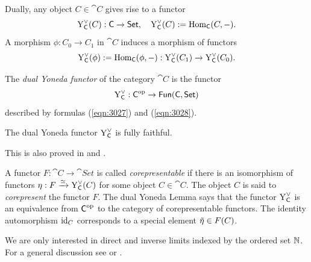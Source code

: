 Dually, any object $C \in \cat{C}$ gives rise to a functor
\begin{equation} \label{eqn:3027}
\operatorname{Y}_{\operatorname{\mathsf{C}}}^{\vee}(C) : \operatorname{\mathsf{C}} \to \operatorname{\mathsf{Set}} , \quad
\operatorname{Y}_{\operatorname{\mathsf{C}}}^{\vee}(C) := \operatorname{Hom}_{\operatorname{\mathsf{C}}}(C, -) . 
\end{equation}
A morphism $\phi : C_0 \to C_1$ in $\cat{C}$ induces a morphism of 
functors
\begin{equation} \label{eqn:3028}
\operatorname{Y}_{\operatorname{\mathsf{C}}}^{\vee}(\phi) := \operatorname{Hom}_{\operatorname{\mathsf{C}}}(\phi, -) : 
\operatorname{Y}_{\operatorname{\mathsf{C}}}^{\vee}(C_1) \to \operatorname{Y}_{\operatorname{\mathsf{C}}}^{\vee}(C_0) .
\end{equation}

\begin{dfn} \label{dfn:3026}
The {\em dual Yoneda functor} of the category $\cat{C}$ is the functor
\[ \operatorname{Y}_{\operatorname{\mathsf{C}}}^{\vee} : \operatorname{\mathsf{C}}^{\mathrm{op}} \to 
\operatorname{\mathsf{Fun}}(\operatorname{\mathsf{C}}, \operatorname{\mathsf{Set}}) \]
described by formulas (\ref{eqn:3027}) and (\ref{eqn:3028}).
\end{dfn}

\begin{thm} \label{thm:3026}
The dual Yoneda functor $\operatorname{Y}_{\operatorname{\mathsf{C}}}^{\vee}$ is fully faithful. 
\end{thm}

This is also proved in \cite[Section III.2]{Mac2} and 
\cite[Section 1.4]{KaSc2}. 

A functor $F : \cat{C} \to \cat{Set}$ is called {\em corepresentable} if there 
is an isomorphism of functors
$\eta : F \xrightarrow{\simeq} \operatorname{Y}_{\operatorname{\mathsf{C}}}^{\vee}(C)$ for some object $C \in \cat{C}$.
The object $C$ is said to {\em corepresent} the functor $F$.
The dual Yoneda Lemma says that the functor $\operatorname{Y}_{\operatorname{\mathsf{C}}}^{\vee}$ is 
an equivalence from $\operatorname{\mathsf{C}}^{\mathrm{op}}$ to the category of corepresentable 
functors. The identity automorphism $\operatorname{id}_C$ corresponds to 
a special element $\tilde{\eta} \in F(C)$.
 


 \label{subsec:inv-dir-lim}
 
We are only interested in direct and inverse limits indexed by the ordered set 
$\mathbb{N}$. For a general discussion see \cite{Mac1} or \cite{KaSc1}. 

